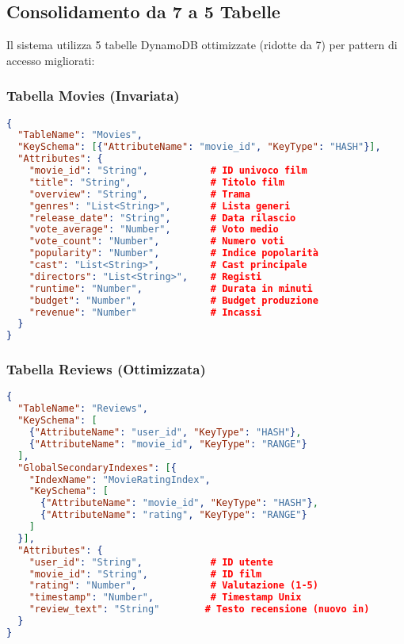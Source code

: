 \documentclass[11pt,a4paper]{article}
\begin{document}
\subsection{Consolidamento da 7 a 5 Tabelle}
Il sistema utilizza 5 tabelle DynamoDB ottimizzate (ridotte da 7) per pattern di accesso migliorati:

\subsubsection{Tabella Movies (Invariata)}
\begin{lstlisting}[language=JSON, caption=Schema Tabella Movies]
{
  "TableName": "Movies",
  "KeySchema": [{"AttributeName": "movie_id", "KeyType": "HASH"}],
  "Attributes": {
    "movie_id": "String",           # ID univoco film
    "title": "String",              # Titolo film
    "overview": "String",           # Trama
    "genres": "List<String>",       # Lista generi
    "release_date": "String",       # Data rilascio
    "vote_average": "Number",       # Voto medio
    "vote_count": "Number",         # Numero voti
    "popularity": "Number",         # Indice popolarità
    "cast": "List<String>",         # Cast principale
    "directors": "List<String>",    # Registi
    "runtime": "Number",            # Durata in minuti
    "budget": "Number",             # Budget produzione
    "revenue": "Number"             # Incassi
  }
}
\end{lstlisting}

\subsubsection{Tabella Reviews (Ottimizzata)}
\begin{lstlisting}[language=JSON, caption=Schema Tabella Reviews]
{
  "TableName": "Reviews",
  "KeySchema": [
    {"AttributeName": "user_id", "KeyType": "HASH"},
    {"AttributeName": "movie_id", "KeyType": "RANGE"}
  ],
  "GlobalSecondaryIndexes": [{
    "IndexName": "MovieRatingIndex",
    "KeySchema": [
      {"AttributeName": "movie_id", "KeyType": "HASH"},
      {"AttributeName": "rating", "KeyType": "RANGE"}
    ]
  }],
  "Attributes": {
    "user_id": "String",            # ID utente
    "movie_id": "String",           # ID film
    "rating": "Number",             # Valutazione (1-5)
    "timestamp": "Number",          # Timestamp Unix
    "review_text": "String"        # Testo recensione (nuovo in)
  }
}
\end{lstlisting}
\end{document}
